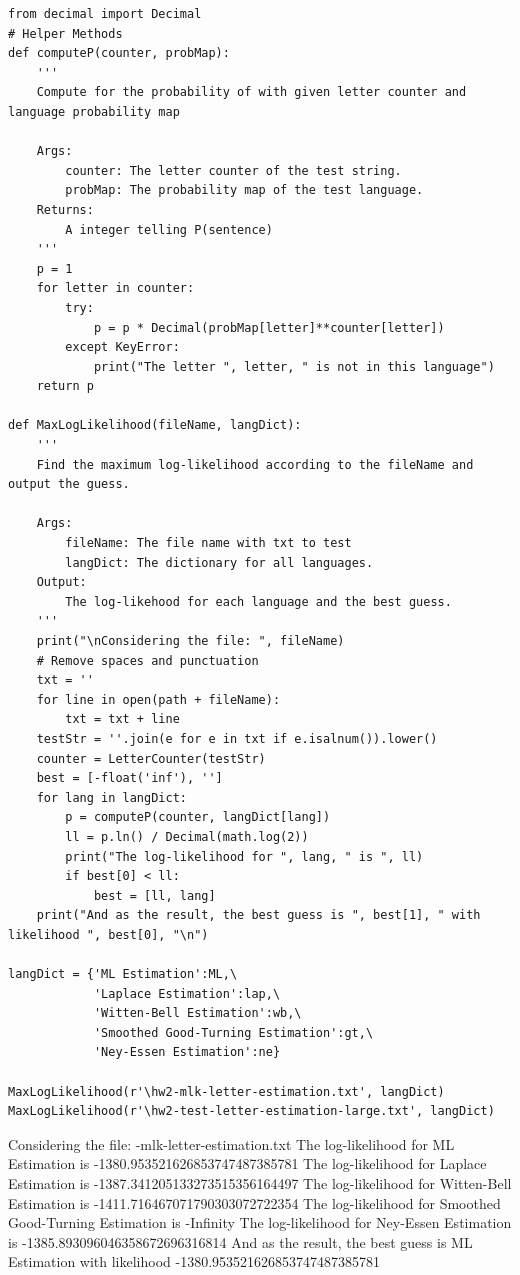 \documentclass[preprint,12pt]{elsarticle}
\begin{document}
\begin{enumerate}
    \begin{lstlisting}
from decimal import Decimal
# Helper Methods
def computeP(counter, probMap):
    '''
    Compute for the probability of with given letter counter and language probability map

    Args:
        counter: The letter counter of the test string.
        probMap: The probability map of the test language.
    Returns:
        A integer telling P(sentence)
    '''
    p = 1
    for letter in counter:
        try:
            p = p * Decimal(probMap[letter]**counter[letter])
        except KeyError:
            print("The letter ", letter, " is not in this language")
    return p

def MaxLogLikelihood(fileName, langDict):
    '''
    Find the maximum log-likelihood according to the fileName and output the guess.

    Args:
        fileName: The file name with txt to test
        langDict: The dictionary for all languages.
    Output:
        The log-likehood for each language and the best guess.
    '''
    print("\nConsidering the file: ", fileName)
    # Remove spaces and punctuation
    txt = ''
    for line in open(path + fileName):
        txt = txt + line
    testStr = ''.join(e for e in txt if e.isalnum()).lower()
    counter = LetterCounter(testStr)
    best = [-float('inf'), '']
    for lang in langDict:
        p = computeP(counter, langDict[lang])
        ll = p.ln() / Decimal(math.log(2))
        print("The log-likelihood for ", lang, " is ", ll)
        if best[0] < ll:
            best = [ll, lang]
    print("And as the result, the best guess is ", best[1], " with likelihood ", best[0], "\n")

langDict = {'ML Estimation':ML,\
            'Laplace Estimation':lap,\
            'Witten-Bell Estimation':wb,\
            'Smoothed Good-Turning Estimation':gt,\
            'Ney-Essen Estimation':ne}

MaxLogLikelihood(r'-mlk-letter-estimation.txt', langDict)
MaxLogLikelihood(r'\hw2-test-letter-estimation-large.txt', langDict)
    \end{lstlisting}
    \begin{spverbatim}
Considering the file:  \hw2-mlk-letter-estimation.txt
The log-likelihood for  ML Estimation  is  
-1380.953521626853747487385781
The log-likelihood for  Laplace Estimation  is  
-1387.341205133273515356164497
The log-likelihood for  Witten-Bell Estimation  is  
-1411.716467071790303072722354
The log-likelihood for  Smoothed Good-Turning Estimation  is  
-Infinity
The log-likelihood for  Ney-Essen Estimation  is  
-1385.893096046358672696316814
And as the result, the best guess is  ML Estimation  with likelihood  
-1380.953521626853747487385781 



\end{spverbatim}
\end{enumerate}
\end{document}
